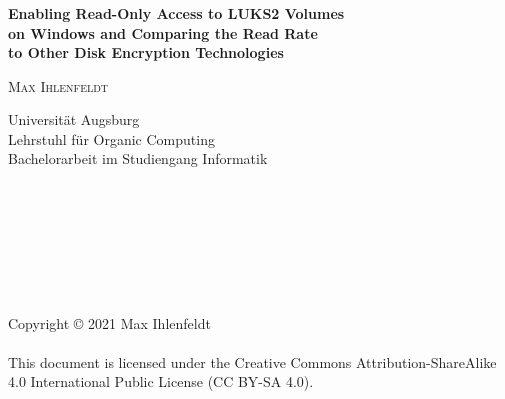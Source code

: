 \begin{verbatim}










\end{verbatim}

\begin{center}
	\huge{\textbf{\titleDocument}}
\end{center}

\begin{center}
	\Large{\textbf{Enabling Read-Only Access to LUKS2 Volumes\\on Windows and Comparing the Read Rate\\to Other Disk Encryption Technologies}}
\end{center}

\vspace{.5em}
\begin{center}
	\large{\textsc{Max Ihlenfeldt}}
\end{center}

\begin{center}
	\large{
		Universität Augsburg \\
		Lehrstuhl für Organic Computing \\
		Bachelorarbeit im Studiengang Informatik
	}
\end{center}

\begin{verbatim}








\end{verbatim}

\begin{center}
	\large{
		Copyright \copyright{} 2021 Max Ihlenfeldt \\
		\phantom{} \\
		This document is licensed under the Creative Commons Attribution-ShareAlike 4.0 International Public License (CC BY-SA 4.0).
	}
\end{center}